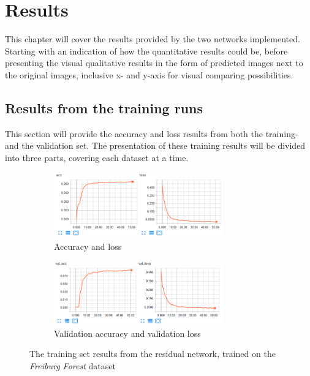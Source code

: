 \documentclass[USenglish]{ifimaster}  %
\begin{document}
\chapter{Results} 
This chapter will cover the results provided by the two networks implemented. Starting with an indication of how the quantitative results could be, before presenting the visual qualitative results in the form of predicted images next to the original images, inclusive x- and y-axis for visual comparing possibilities. 

\section{Results from the training runs}
This section will provide the accuracy and loss results from both the training- and the validation set. The presentation of these training results will be divided into three parts, covering each dataset at a time. 

\begin{figure}[ht]
\centering
\begin{subfigure}[b]{\textwidth}
\centering
\includegraphics[width=0.8\textwidth]{bilder/freiburg_training/freiburg_residual_training_acc_results.png}
\caption{Accuracy and loss}
\label{fig:freiburg_residual_acc_result}
\end{subfigure}
\hfill
\begin{subfigure}[b]{\textwidth}
\centering
\includegraphics[width=0.8\textwidth]{bilder/freiburg_training/freiburg_residual_training_val_acc_results.png}
\caption{Validation accuracy and validation loss}
\label{fig:freiburg_residual_val_acc_result}
\end{subfigure}
\caption{The training set results from the residual network, trained on the \textit{Freiburg Forest} dataset}
\label{fig:freiburg_residual_result}
\end{figure}
\end{document}
